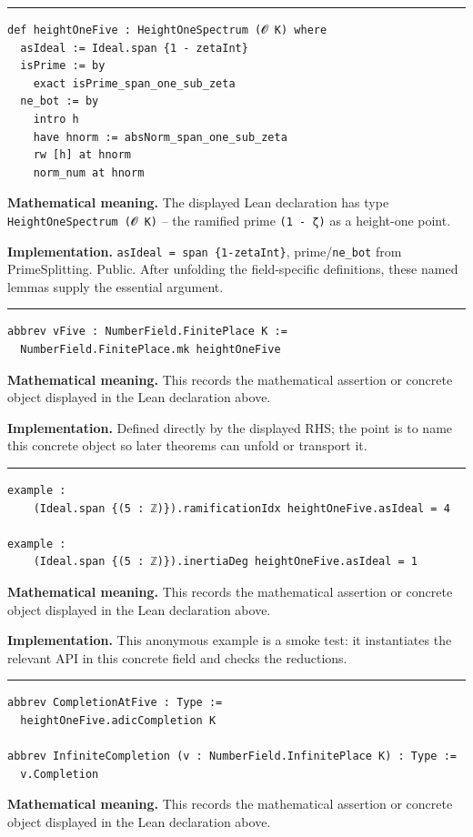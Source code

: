 \documentclass[UTF8,a4paper,11pt,fontset=fandol]{ctexart}
\theoremstyle{definition}
\newcommand{\statementsep}{\par\medskip\hrule\medskip}
\begin{document}
\statementsep
\begin{verbatim}
def heightOneFive : HeightOneSpectrum (𝓞 K) where
  asIdeal := Ideal.span {1 - zetaInt}
  isPrime := by
    exact isPrime_span_one_sub_zeta
  ne_bot := by
    intro h
    have hnorm := absNorm_span_one_sub_zeta
    rw [h] at hnorm
    norm_num at hnorm
\end{verbatim}
\noindent\textbf{Mathematical meaning.} The displayed Lean declaration has type \texttt{HeightOneSpectrum (𝓞 K)} -- the ramified prime \texttt{(1 - ζ)} as a height-one point.\par
\noindent\textbf{Implementation.} \texttt{asIdeal = span \{1-zetaInt\}}, prime/\texttt{ne\_\allowbreak{}bot} from PrimeSplitting. Public. After unfolding the field-specific definitions, these named lemmas supply the essential argument.\par
\statementsep
\begin{verbatim}
abbrev vFive : NumberField.FinitePlace K :=
  NumberField.FinitePlace.mk heightOneFive
\end{verbatim}
\noindent\textbf{Mathematical meaning.} This records the mathematical assertion or concrete object displayed in the Lean declaration above.\par
\noindent\textbf{Implementation.} Defined directly by the displayed RHS; the point is to name this concrete object so later theorems can unfold or transport it.\par
\statementsep
\begin{verbatim}
example :
    (Ideal.span {(5 : ℤ)}).ramificationIdx heightOneFive.asIdeal = 4

example :
    (Ideal.span {(5 : ℤ)}).inertiaDeg heightOneFive.asIdeal = 1
\end{verbatim}
\noindent\textbf{Mathematical meaning.} This records the mathematical assertion or concrete object displayed in the Lean declaration above.\par
\noindent\textbf{Implementation.} This anonymous example is a smoke test: it instantiates the relevant API in this concrete field and checks the reductions.\par
\statementsep
\begin{verbatim}
abbrev CompletionAtFive : Type :=
  heightOneFive.adicCompletion K

abbrev InfiniteCompletion (v : NumberField.InfinitePlace K) : Type :=
  v.Completion
\end{verbatim}
\noindent\textbf{Mathematical meaning.} This records the mathematical assertion or concrete object displayed in the Lean declaration above.\par
\end{document}
